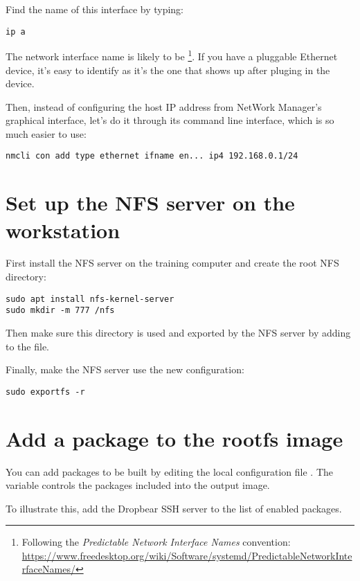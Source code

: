 Find the name of this interface by typing:
\begin{verbatim}
ip a
\end{verbatim}

The network interface name is likely to be
\footnote{Following the {\em Predictable Network Interface
Names} convention:
\url{https://www.freedesktop.org/wiki/Software/systemd/PredictableNetworkInterfaceNames/}}.
If you have a pluggable Ethernet device, it's easy to identify as it's
the one that shows up after pluging in the device.

Then, instead of configuring the host IP address from NetWork Manager’s graphical interface,
let’s do it through its command line interface, which is so much easier to use:

\begin{verbatim}
nmcli con add type ethernet ifname en... ip4 192.168.0.1/24
\end{verbatim}

\section{Set up the NFS server on the workstation}

First install the NFS server on the training computer and create the root NFS
directory:
\begin{verbatim}
sudo apt install nfs-kernel-server
sudo mkdir -m 777 /nfs
\end{verbatim}

Then make sure this directory is used and exported by the NFS server by adding
 to the
 file.

Finally, make the NFS server use the new configuration:
\begin{verbatim}
sudo exportfs -r
\end{verbatim}

\section{Add a package to the rootfs image}

You can add packages to be built by editing the local configuration file
. The  variable controls the
packages included into the output image.

To illustrate this, add the Dropbear SSH server to the list of enabled
packages.

